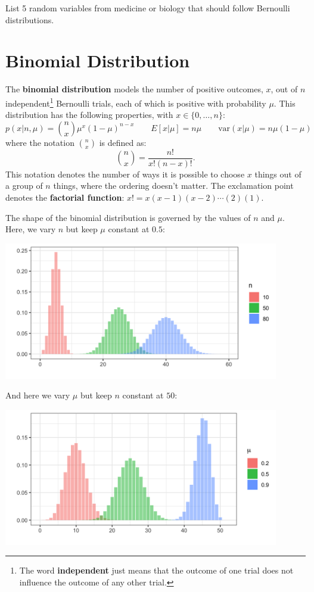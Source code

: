 \begin{question}{}
List 5 random variables from medicine or biology that should follow Bernoulli distributions.
\end{question}


\section{Binomial Distribution \label{sect:binomial}}

The \textbf{binomial distribution} models the number of positive outcomes, $x$, out of $n$ independent\footnote{The word \textbf{independent} just means that the outcome of one trial does not influence the outcome of any other trial.} Bernoulli trials, each of which is positive with probability $\mu$. This distribution has the following properties, with $x \in \{0, \dots, n\}$:
$$ p(x|n,\mu) = {n\choose x} \mu^x (1 - \mu) ^ {n-x} \qquad E[x| \mu] = n \mu \qquad \text{var}(x | \mu) = n \mu (1 - \mu) $$
where the notation ${n \choose x}$ is defined as:
$$ {n \choose x} = \frac{n!}{x!(n-x)!}. $$
This notation denotes the number of ways it is possible to choose $x$ things out of a group of $n$ things, where the ordering doesn't matter. The exclamation point denotes the \textbf{factorial function}: $x! = x(x-1)(x-2)\cdots(2)(1)$. 

The shape of the binomial distribution is governed by the values of $n$ and $\mu$. Here, we vary $n$ but keep $\mu$ constant at $0.5$:
\begin{center}
\includegraphics[width=0.9\textwidth]{img/l01-figure3-binom-n-change.png}
\end{center}
And here we vary $\mu$ but keep $n$ constant at $50$:
\begin{center}
\includegraphics[width=0.9\textwidth]{img/l01-figure4-binom-p-change.png}
\end{center}

